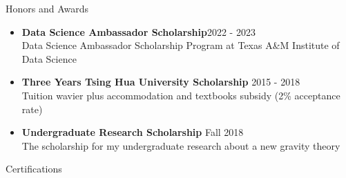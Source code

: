 \documentclass{resume}
\begin{document}
\vspace{-0.25em}
\begin{rSection}{Honors and Awards}
    \begin{itemize}
        \item \textbf{Data Science Ambassador Scholarship}\hfill 2022 - 2023\\
        Data Science Ambassador Scholarship Program at Texas A\&M Institute of Data Science
        \item \textbf{Three Years Tsing Hua University Scholarship} \hfill 2015 - 2018 \\
        Tuition wavier plus accommodation and textbooks subsidy (2\% acceptance rate)
        \item \textbf{Undergraduate Research Scholarship} \hfill Fall 2018 \\
        The scholarship for my undergraduate research about a new gravity theory
    \end{itemize}
\end{rSection}


\vspace{-0.25em}
\begin{rSection}{Certifications}
    \vspace{-1.2em}
    \item \href{https://www.coursera.org/account/accomplishments/verify/N4T4JR8XLU3Z}{\color{black}{~~~~\textbullet~~Machine Learning Foundations: Algorithmic Foundations}} \vspace{-0.5em}
    \item \href{https://www.coursera.org/account/accomplishments/verify/4X4TD24NFAY4}{\color{black}{~~~~\textbullet~~Machine Learning Foundations: Mathematical Foundations}} \vspace{-0.5em}
    \item \href{https://www.coursera.org/account/accomplishments/verify/TJKKSPN42ZEE}{\color{black}{~~~~\textbullet~~Machine Learning Techniques}} \vspace{-0.5em}
    \item \href{https://www.coursera.org/account/accomplishments/verify/KHCRSS4J4TZE}{\color{black}{~~~~\textbullet~~Divide and Conquer, Sorting and Searching, and Randomized Algorithms}} \vspace{-0.5em}
    \item \href{https://www.coursera.org/account/accomplishments/verify/5B7WBDL9BHVF}{\color{black}{~~~~\textbullet~~A Crash Course in Causality: Inferring Causal Effects from Observational Data}}  \vspace{-0.5em}
\end{rSection}
\end{document}
